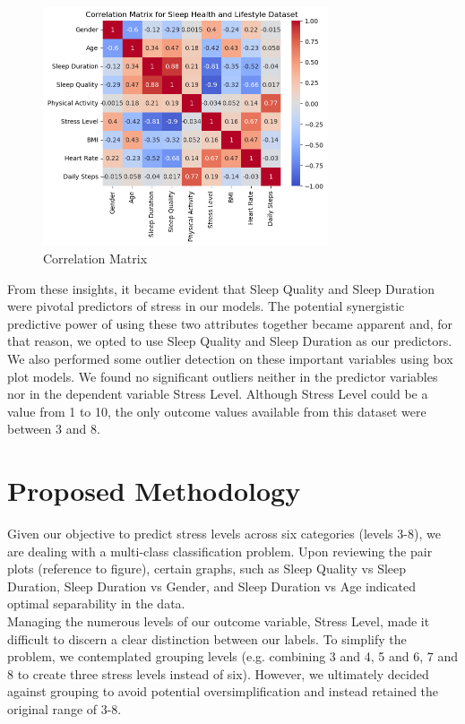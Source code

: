 \documentclass[11pt, letterpaper]{article}
\begin{document}
    \begin{figure}[H]
        \centering
        \includegraphics[width=0.75\textwidth]{correlation.png}
        \caption{Correlation Matrix}
        \label{fig:correlation}
    \end{figure}

    \noindent From these insights, it became evident that Sleep Quality and Sleep Duration were pivotal predictors of stress in our models. The potential synergistic predictive power of using these two attributes together became apparent and, for that reason, we opted to use Sleep Quality and Sleep Duration as our predictors.\\
    
    \noindent We also performed some outlier detection on these important variables using box plot models. We found no significant outliers neither in the predictor variables nor in the dependent variable Stress Level. Although Stress Level could be a value from 1 to 10, the only outcome values available from this dataset were between 3 and 8.\\
    
    \section*{Proposed Methodology}
    \noindent Given our objective to predict stress levels across six categories (levels 3-8), we are dealing with a multi-class classification problem. Upon reviewing the pair plots (reference to figure), certain graphs, such as Sleep Quality vs Sleep Duration, Sleep Duration vs Gender, and Sleep Duration vs Age indicated optimal separability in the data.\\

    \noindent Managing the numerous levels of our outcome variable, Stress Level, made it difficult to discern a clear distinction between our labels. To simplify the problem, we contemplated grouping levels (e.g. combining 3 and 4, 5 and 6, 7 and 8 to create three stress levels instead of six). However, we ultimately decided against grouping to avoid potential oversimplification and instead retained the original range of 3-8.\\
\end{document}
